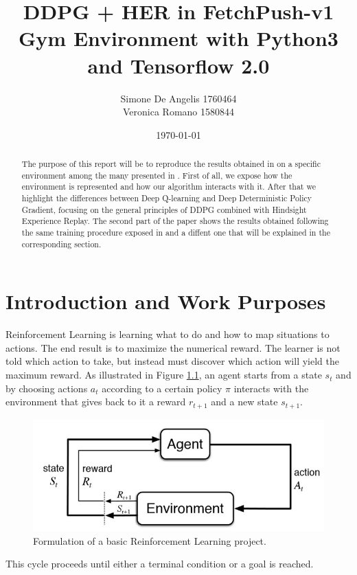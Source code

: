 \documentclass[a4paper]{report}
\title{DDPG + HER in FetchPush-v1 Gym Environment with Python3 and Tensorflow 2.0}
\author{Simone De Angelis 1760464\\ Veronica Romano 1580844}
\date{\today}
\begin{document}
\maketitle
\begin{abstract}
The purpose of this report will be to reproduce the results obtained in \cite{her} on a specific environment among the many presented in \cite{her}. First of all, we expose how the environment is represented and how our algorithm interacts with it. After that we highlight the differences between Deep Q-learning and Deep Deterministic Policy Gradient, focusing  on the general principles of DDPG combined with Hindsight Experience Replay.
The second part of the paper shows the results obtained following the same training procedure exposed in \cite{her} and a diffent one that will be explained in the corresponding section.
\end{abstract}
\chapter{Introduction and Work Purposes}
Reinforcement Learning is learning what to do and how to map situations to actions. The end result is to maximize the numerical reward. The learner is not told which action to take, but instead must discover which action will yield the maximum reward. As illustrated in Figure \ref{Fig: scheme}, an agent starts from a state $s_t$ and by choosing actions $a_t$ according to  a certain policy $\pi$ interacts with the environment that gives back to it  a reward $r_{t+1}$ and a new state $s_{t+1}$.

\begin{figure}[h!]
\centering
\includegraphics[scale=0.5]{reinforcement.jpg}
\caption{\label{Fig: scheme} Formulation of a basic Reinforcement Learning project.}
\end{figure}

This cycle proceeds until either a terminal condition or a goal is reached. 
\end{document}

